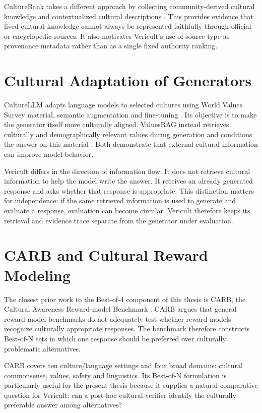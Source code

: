 CultureBank takes a different approach by collecting community-derived cultural knowledge and contextualized cultural descriptions \parencite{shi2024culturebank}. This provides evidence that lived cultural knowledge cannot always be represented faithfully through official or encyclopedic sources. It also motivates Vericult's use of source type as provenance metadata rather than as a single fixed authority ranking.

\section{Cultural Adaptation of Generators}

CultureLLM adapts language models to selected cultures using World Values Survey material, semantic augmentation and fine-tuning \parencite{li2024culturellm}. Its objective is to make the generator itself more culturally aligned. ValuesRAG instead retrieves culturally and demographically relevant values during generation and conditions the answer on this material \parencite{seo2025valuesrag}. Both demonstrate that external cultural information can improve model behavior.

Vericult differs in the direction of information flow. It does not retrieve cultural information to help the model write the answer. It receives an already generated response and asks whether that response is appropriate. This distinction matters for independence: if the same retrieved information is used to generate and evaluate a response, evaluation can become circular. Vericult therefore keeps its retrieval and evidence trace separate from the generator under evaluation.

\section{CARB and Cultural Reward Modeling}
\label{sec:carb}

The closest prior work to the Best-of-4 component of this thesis is CARB, the Cultural Awareness Reward-model Benchmark \parencite{zhang2026carb}. CARB argues that general reward-model benchmarks do not adequately test whether reward models recognize culturally appropriate responses. The benchmark therefore constructs Best-of-N sets in which one response should be preferred over culturally problematic alternatives.

CARB covers ten culture/language settings and four broad domains: cultural commonsense, values, safety and linguistics. Its Best-of-N formulation is particularly useful for the present thesis because it supplies a natural comparative question for Vericult: can a post-hoc cultural verifier identify the culturally preferable answer among alternatives?

